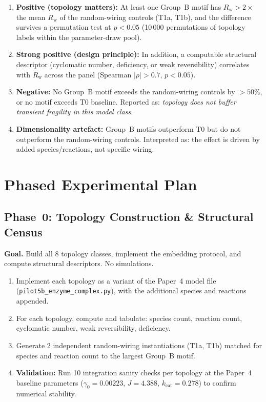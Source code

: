 \documentclass[aps,prl,twocolumn,superscriptaddress,floatfix]{revtex4-2}
\newcommand{\kcat}{k_{\mathrm{cat}}}
\newcommand{\Rw}{R_{\mathrm{w}}}
\begin{document}
\begin{enumerate}
  \item \textbf{Positive (topology matters):}
    At least one Group~B motif has $\Rw > 2\times$ the mean
    $\Rw$ of the random-wiring controls (T1a, T1b), and the
    difference survives a permutation test at $p < 0.05$
    (10\,000 permutations of topology labels within the
    parameter-draw pool).

  \item \textbf{Strong positive (design principle):}
    In addition, a computable structural descriptor (cyclomatic
    number, deficiency, or weak reversibility) correlates with
    $\Rw$ across the panel (Spearman $|\rho| > 0.7$, $p < 0.05$).

  \item \textbf{Negative:}
    No Group~B motif exceeds the random-wiring controls by
    $> 50\%$, or no motif exceeds T0 baseline.  Reported as:
    \emph{topology does not buffer transient fragility in this
    model class.}

  \item \textbf{Dimensionality artefact:}
    Group~B motifs outperform T0 but do not outperform the
    random-wiring controls.  Interpreted as: the effect is
    driven by added species/reactions, not specific wiring.
\end{enumerate}

\section{Phased Experimental Plan}

\subsection{Phase~0: Topology Construction \& Structural Census}
\label{sec:phase0}

\textbf{Goal.}  Build all 8 topology classes, implement the
embedding protocol, and compute structural descriptors.  No
simulations.

\begin{enumerate}[label=0.\arabic*]
  \item Implement each topology as a variant of the Paper~4
    model file (\texttt{pilot5b\_enzyme\_complex.py}), with
    the additional species and reactions appended.

  \item For each topology, compute and tabulate: species count,
    reaction count, cyclomatic number, weak reversibility,
    deficiency.

  \item Generate 2 independent random-wiring instantiations
    (T1a, T1b) matched for species and reaction count to the
    largest Group~B motif.

  \item \textbf{Validation:}  Run 10 integration sanity checks
    per topology at the Paper~4 baseline parameters
    ($\gamma_0 = 0.00223$, $J = 4.388$, $\kcat = 0.278$)
    to confirm numerical stability.
\end{enumerate}
\end{document}
